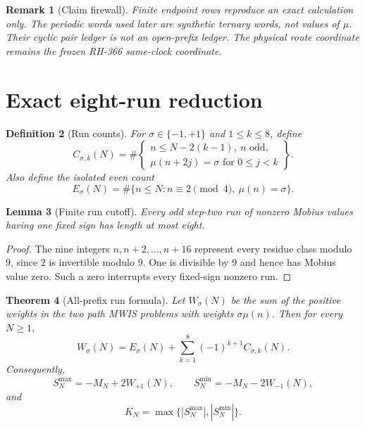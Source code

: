 \documentclass[11pt]{article}
\newtheorem{theorem}{Theorem}[section]
\newtheorem{lemma}[theorem]{Lemma}
\newtheorem{remark}[theorem]{Remark}
\newtheorem{definition}[theorem]{Definition}
\newcommand{\Mob}{\mu}
\begin{document}
\begin{remark}[Claim firewall]
Finite endpoint rows reproduce an exact calculation only.  The periodic
words used later are synthetic ternary words, not values of $\Mob$.  Their
cyclic pair ledger is not an open-prefix ledger.  The physical route
coordinate remains the frozen RH-366 same-clock coordinate.
\end{remark}

\section{Exact eight-run reduction}

\begin{definition}[Run counts]
For $\sigma\in\{-1,+1\}$ and $1\leq k\leq8$, define
\begin{equation}
 C_{\sigma,k}(N)=\#\left\{\begin{array}{l}
 n\leq N-2(k-1),\ n\text{ odd},\\
 \Mob(n+2j)=\sigma\text{ for }0\leq j<k
 \end{array}\right\}.
 \label{eq:C}
\end{equation}
Also define the isolated even count
\begin{equation}
 E_\sigma(N)=\#\{n\leq N:n\equiv2\pmod4,\ \Mob(n)=\sigma\}.
 \label{eq:E}
\end{equation}
\end{definition}

\begin{lemma}[Finite run cutoff]
Every odd step-two run of nonzero Mobius values having one fixed sign has
length at most eight.
\end{lemma}

\begin{proof}
The nine integers $n,n+2,\ldots,n+16$ represent every residue class modulo
9, since $2$ is invertible modulo 9.  One is divisible by 9 and hence has
Mobius value zero.  Such a zero interrupts every fixed-sign nonzero run.
\end{proof}

\begin{theorem}[All-prefix run formula]
Let $W_\sigma(N)$ be the sum of the positive weights in the two path MWIS
problems with weights $\sigma\Mob(n)$.  Then for every $N\geq1$,
\begin{equation}
 W_\sigma(N)=E_\sigma(N)+
 \sum_{k=1}^{8}(-1)^{k+1}C_{\sigma,k}(N).
 \label{eq:runformula}
\end{equation}
Consequently,
\begin{equation}
 S_N^{\max}=-M_N+2W_{+1}(N),\qquad
 S_N^{\min}=-M_N-2W_{-1}(N),
 \label{eq:extremes}
\end{equation}
and
\begin{equation}
 K_N=\max\bigl\{|S_N^{\max}|,|S_N^{\min}|\bigr\}.
 \label{eq:Kformula}
\end{equation}
\end{theorem}
\end{document}
